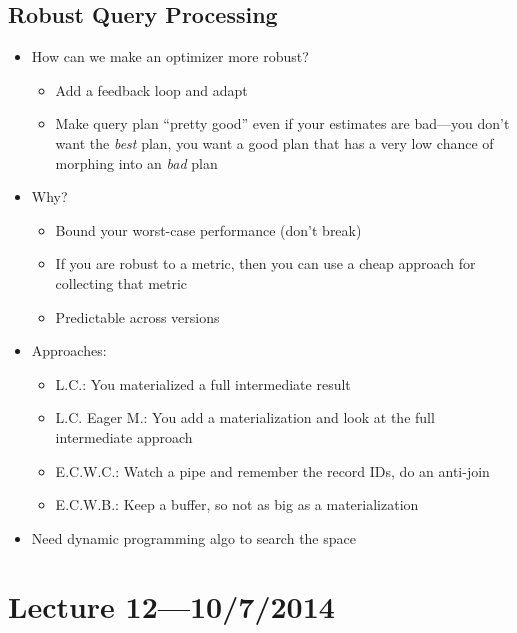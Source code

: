 \documentclass[10pt]{article}
\begin{document}
\subsection{Robust Query Processing}

\begin{itemize}
\item How can we make an optimizer more robust?
\begin{itemize}
\item Add a feedback loop and adapt
\item Make query plan ``pretty good'' even if your estimates are bad---you don't want the \emph{best}
plan, you want a good plan that has a very low chance of morphing into an \emph{bad} plan
\end{itemize}
\item Why?
\begin{itemize}
\item Bound your worst-case performance (don't break)
\item If you are robust to a metric, then you can use a cheap approach for collecting that metric
\item Predictable across versions
\end{itemize}
\item Approaches:
\begin{itemize}
\item L.C.: You materialized a full intermediate result
\item L.C. Eager M.: You add a materialization and look at the full intermediate approach
\item E.C.W.C.: Watch a pipe and remember the record IDs, do an anti-join
\item E.C.W.B.: Keep a buffer, so not as big as a materialization
\end{itemize}
\item Need dynamic programming algo to search the space
\end{itemize}

\section{Lecture 12---10/7/2014}
\end{document}
